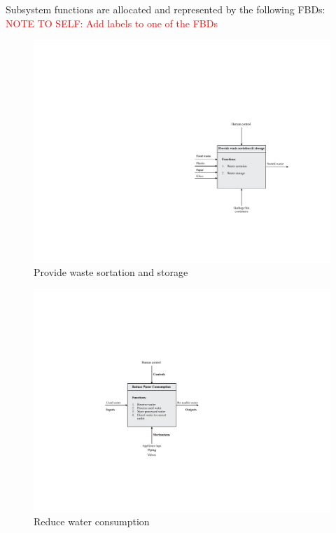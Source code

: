 \documentclass[a4paper,11pt,fleqn]{report}
\begin{document}
{Subsystem functions are allocated and represented by the following \ac{FBD}s:\\ \textcolor{red}{NOTE TO SELF: Add labels to one of the FBDs}
%
\begin{figure}[h!]
\begin{center}
\includegraphics[scale = 0.8]{Function1.pdf}
\caption{Provide waste sortation and storage}
\label{fig: Function1}
\end{center}
\end{figure}
%
\begin{figure}[h!]
\begin{center}
\includegraphics[scale = 0.8]{Function2.pdf}
\caption{Reduce water consumption}
\label{fig: Function2}
\end{center}

\end{figure}}
\end{document}
